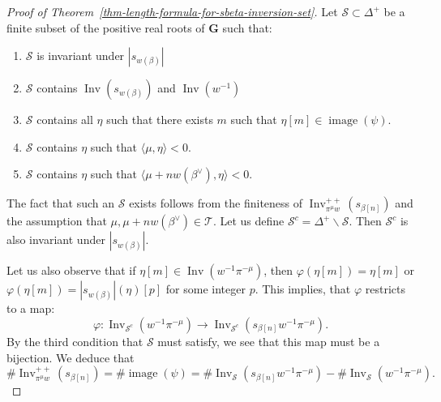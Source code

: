 \documentclass[ALCO,ThmDefs,Unicode]{cedram}
\DeclareMathOperator{\im}{image}
\DeclareMathOperator{\Inv}{Inv}
\newcommand{\betacheck}{\beta^\vee}
\newcommand{\bG}{\mathbf{G}}
\newcommand{\cS}{\mathcal{S}}
\newcommand{\cT}{\mathcal{T}}
\newcommand{\TitsCone}{\cT}
\begin{document}
\begin{proof}[Proof of Theorem~\ref{thm-length-formula-for-sbeta-inversion-set}]
Let $\cS \subset \Delta^+$ be a finite subset of the positive real roots of $\bG$ such that:
\begin{enumerate}
\item $\cS$ is invariant under $|s_{w(\beta)}|$
\item $\cS$ contains $\Inv(s_{w(\beta)})$ and $\Inv(w^{-1})$
\item $\cS$ contains all $\eta$ such that there exists $m$ such that $\eta[m] \in \im(\psi)$.
\item $\cS$ contains $\eta$ such that $\langle \mu, \eta \rangle < 0$.
\item $\cS$ contains $\eta$ such that $\langle \mu + n w(\betacheck), \eta \rangle < 0$.
\end{enumerate}
The fact that such an $\cS$ exists follows from the finiteness of $\Inv^{++}_{\pi^\mu w}(s_{\beta[n]})$ and the assumption that $\mu,\mu+nw(\betacheck)\in\TitsCone$. Let us define $\cS^c = \Delta^+ \backslash \cS$. Then $\cS^c$ is also invariant under $|s_{w(\beta)}|$.

Let us also observe that if $\eta[m] \in \Inv(w^{-1}\pi^{-\mu})$, then $\varphi(\eta[m]) = \eta[m]$ or $\varphi(\eta[m]) = |s_{w(\beta)}|(\eta)[p]$ for some integer $p$. This implies, that $\varphi$ restricts to a map:
\begin{equation*}
\varphi: \Inv_{\cS^c} (w^{-1} \pi^{-\mu}) \rightarrow \Inv_{\cS^c}(s_{\beta[n]} w^{-1} \pi^{-\mu}).
\end{equation*}
By the third condition that $\cS$ must satisfy, we see that this map must be a bijection. We deduce that
\begin{equation*}
\# \Inv^{++}_{\pi^\mu w}(s_{\beta[n]}) = \# \im(\psi) = \# \Inv_{\cS}(s_{\beta[n]} w^{-1} \pi^{-\mu}) - \# \Inv_{\cS}(w^{-1} \pi^{-\mu}).
\end{equation*}


\end{proof}
\end{document}
